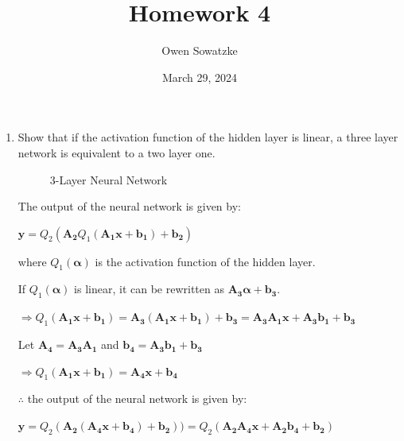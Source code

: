 \documentclass[fleqn]{article}
\title{Homework 4}
\author{Owen Sowatzke}
\date{March 29, 2024}
\newcommand{\zerodisplayskip}{
	\setlength{\abovedisplayskip}{0pt}%
	\setlength{\belowdisplayskip}{0pt}%
	\setlength{\abovedisplayshortskip}{0pt}%
	\setlength{\belowdisplayshortskip}{0pt}%
	\setlength{\mathindent}{0pt}}
\begin{document}
	\offinterlineskip
	\setlength{\lineskip}{12pt}
	\zerodisplayskip
	\maketitle
	
	\begin{enumerate}
		\item Show that if the activation function of the hidden layer is linear, a three layer network is equivalent to a two layer one.
		
		\begin{figure}[H]
			\centerline{}
			\caption{3-Layer Neural Network}
			\label{neural_network_3_layer}
		\end{figure}
	
		The output of the neural network is given by:
		
		$\mathbf{y} = Q_2(\mathbf{A_2}Q_1(\mathbf{A_1}\mathbf{x} + \mathbf{b_1}) + \mathbf{b_2})$
		
		where $Q_1(\boldsymbol{\alpha})$ is the activation function of the hidden layer.
		
		If $Q_1(\boldsymbol{\alpha})$ is linear, it can be rewritten as $\mathbf{A_3}\boldsymbol{\alpha} + \mathbf{b_3}$. 
		
		$\Rightarrow Q_1(\mathbf{A_1}\mathbf{x} + \mathbf{b_1}) = \mathbf{A_3}(\mathbf{A_1}\mathbf{x} + \mathbf{b_1}) + \mathbf{b_3} = \mathbf{A_3}\mathbf{A_1}\mathbf{x} + \mathbf{A_3}\mathbf{b_1} + \mathbf{b_3}$
		
		Let $\mathbf{A_4} = \mathbf{A_3}\mathbf{A_1}$ and $\mathbf{b_4} = \mathbf{A_3}\mathbf{b_1} + \mathbf{b_3}$
		
		$\Rightarrow Q_1(\mathbf{A_1}\mathbf{x} + \mathbf{b_1}) = \mathbf{A_4}\mathbf{x} + \mathbf{b_4}$
		
		$\therefore$ the output of the neural network is given by:
		
		$\mathbf{y} = Q_2(\mathbf{A_2}(\mathbf{A_4}\mathbf{x} + \mathbf{b_4}) + \mathbf{b_2})) = Q_2(\mathbf{A_2}\mathbf{A_4}\mathbf{x} + \mathbf{A_2}\mathbf{b_4} + \mathbf{b_2})$
		

\end{enumerate}
\end{document}
